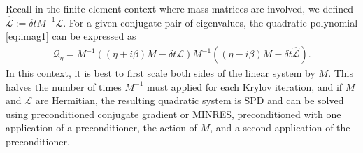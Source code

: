 \documentclass[review]{siamart}
\begin{document}
\begin{remark}

Recall in the finite element context where mass matrices are involved, we defined
$\widehat{\mathcal{L}} := \delta t M^{-1}\mathcal{L}$. For a given conjugate pair
of eigenvalues, the quadratic polynomial \eqref{eq:imag1} can be expressed as
%
\begin{align}\label{eq:scaleM}
\mathcal{Q}_\eta = M^{-1}((\eta + i\beta)M - \delta t{\mathcal{L}})M^{-1}((\eta - i\beta)M -
	\delta t\widehat{\mathcal{L}}).
\end{align}
%
In this context, it is best to first scale both sides of the linear system by $M$.
This halves the number of times $M^{-1}$ must applied for each Krylov iteration,
and if $M$ and $\mathcal{L}$ are Hermitian, the resulting quadratic system is SPD
and can be solved using preconditioned conjugate gradient or MINRES, preconditioned
with one application of a preconditioner, the action of $M$, and a second application
of the preconditioner.
\end{remark}
\end{document}
